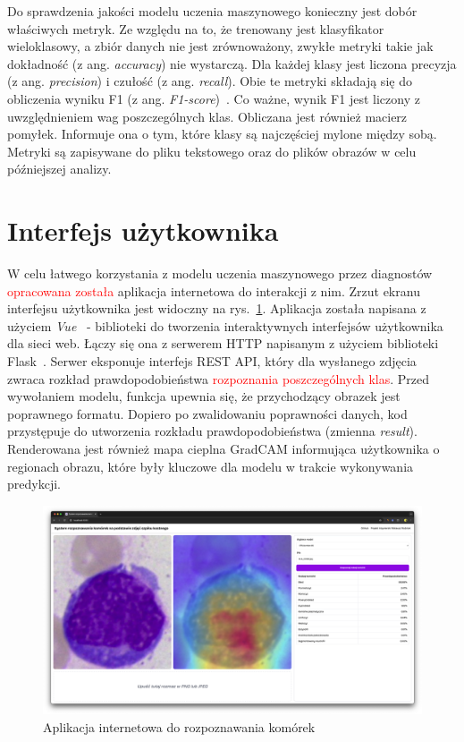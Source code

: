 Do sprawdzenia jakości modelu uczenia maszynowego konieczny jest dobór właściwych metryk.
Ze względu na to, że trenowany jest klasyfikator wieloklasowy, a zbiór danych nie jest zrównoważony, zwykłe metryki takie jak dokładność (z ang. \textit{accuracy}) nie wystarczą.
Dla każdej klasy jest liczona precyzja (z ang. \textit{precision}) i czułość (z ang. \textit{recall}).
Obie te metryki składają się do obliczenia wyniku F1 (z ang. \textit{F1-score})~\cite{geron}.
Co ważne, wynik F1 jest liczony z uwzględnieniem wag poszczególnych klas.
Obliczana jest również macierz pomyłek.
Informuje ona o tym, które klasy są najczęściej mylone między sobą.
Metryki są zapisywane do pliku tekstowego oraz do plików obrazów w celu późniejszej analizy.


\section{Interfejs użytkownika}

W celu łatwego korzystania z modelu uczenia maszynowego przez diagnostów \textcolor{red}{opracowana została} aplikacja internetowa do interakcji z nim.
Zrzut ekranu interfejsu użytkownika jest widoczny na rys.~\ref{fig:ui}.
Aplikacja została napisana z użyciem \textit{Vue}~\cite{vue} - biblioteki do tworzenia interaktywnych interfejsów użytkownika dla sieci web.
Łączy się ona z serwerem HTTP napisanym z użyciem biblioteki Flask~\cite{flask}.
Serwer eksponuje interfejs REST API, który dla wysłanego zdjęcia zwraca rozkład prawdopodobieństwa \textcolor{red}{ rozpoznania poszczególnych klas}.
Przed wywołaniem modelu, funkcja upewnia się, że przychodzący obrazek jest poprawnego formatu.
Dopiero po zwalidowaniu poprawności danych, kod przystępuje do utworzenia rozkładu prawdopodobieństwa (zmienna \textit{result}).
Renderowana jest również mapa cieplna GradCAM informująca użytkownika o regionach obrazu, które były kluczowe dla modelu w trakcie wykonywania predykcji.


\begin{figure}
    \centering
    \includegraphics[width=\textwidth]{app}
    \caption{Aplikacja internetowa do rozpoznawania komórek}
    \label{fig:ui}
\end{figure}


